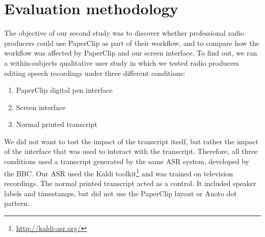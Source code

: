 





\section{Evaluation methodology}\label{sec:paper-method}

The objective of our second study was to discover whether professional radio producers could use PaperClip as part of
their workflow, and to compare how the workflow was affected by PaperClip and our screen interface.  To find out, we
ran a within-subjects qualitative user study in which we tested radio producers editing speech recordings under three
different conditions:

\begin{enumerate}[label=C\arabic*.]
  \item PaperClip digital pen interface
  \item Screen interface
  \item Normal printed transcript
\end{enumerate}

We did not want to test the impact of the transcript itself, but rather the impact of the interface that was used to
interact with the transcript. Therefore, all three conditions used a transcript generated by the same ASR system,
developed by the BBC. Our ASR used the Kaldi toolkit\footnote{\url{http://kaldi-asr.org/}} and was trained on
television recordings.  The normal printed transcript acted as a control. It included speaker labels and timestamps,
but did not use the PaperClip layout or Anoto dot pattern.

